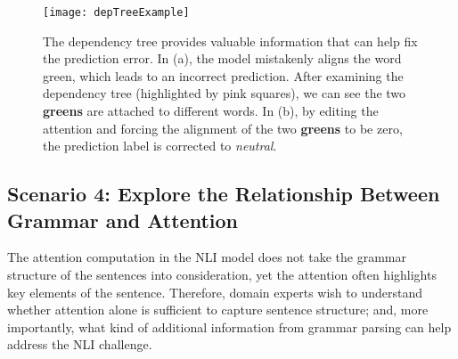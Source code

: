 
%
\begin{figure*}[t]
\centering
\vspace{-2mm}
 \texttt{[image: depTreeExample]}
  \vspace{-3mm}
 \caption{
The dependency tree provides valuable information that can help fix the prediction error.
In (a), the model mistakenly aligns the word green, which leads to an incorrect prediction.
After examining the dependency tree (highlighted by pink squares), we can see the two \textbf{greens} are attached to different words.
In (b), by editing the attention and forcing the alignment of the two \textbf{greens} to be zero, the prediction label is corrected to \emph{neutral}.
 }
\label{fig:depTreeExample}
 \vspace{-4mm}
\end{figure*}

\subsection{Scenario 4: Explore the Relationship Between Grammar and Attention}
\label{sec:grammarAttention}
The attention computation in the NLI model does not take the grammar structure of the sentences into consideration,
yet the attention often highlights key elements of the sentence.
Therefore, domain experts wish to understand whether attention alone is sufficient to capture sentence structure;
and, more importantly, what kind of additional information from grammar parsing can help address the NLI challenge.

